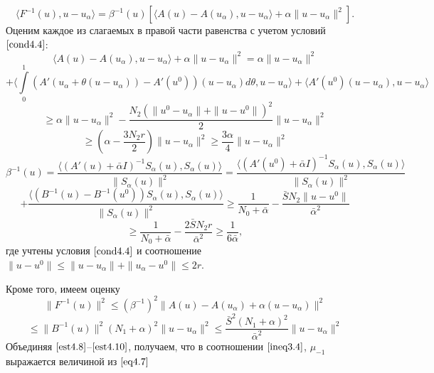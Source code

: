 $$\langle F^{-1}(u), u-u_\alpha\rangle=\beta ^{-1}(u)[\langle A(u)-A(u_\alpha), u-u_\alpha\rangle+\alpha\|u-u_\alpha\|^2].$$
Оценим каждое из слагаемых в правой части равенства с учетом условий $\eqref{cond4.4}$:
$$\langle A(u)-A(u_\alpha), u-u_\alpha\rangle+\alpha\|u-u_\alpha\|^2=\alpha\|u-u_\alpha\|^2$$ $$+\langle \int\limits_0^1 (A'(u_\alpha+\theta(u-u_\alpha))-A'(u^0))(u-u_\alpha)d\theta, u-u_\alpha\rangle+\langle A'(u^0)(u-u_\alpha), u-u_\alpha\rangle$$ $$\ge \alpha\|u-u_\alpha\|^2-\frac{N_2(\|u^0-u_\alpha\|+\|u-u^0\|)^2}{2}\|u-u_\alpha\|^2$$
\begin{equation}\label {est4.8}
\ge\left ( \alpha-\frac{3N_2 r}{2}\right )\|u-u_\alpha\|^2\ge\frac{3\alpha}{4}\|u-u_\alpha\|^2
\end{equation}
$$\beta ^{-1}(u)=\frac{\langle (A'(u)+\bar\alpha I)^{-1}S_\alpha(u), S_\alpha(u)\rangle}{\|S_\alpha(u)\|^2}=\frac{\langle (A'(u^0)+\bar\alpha I)^{-1}S_\alpha(u), S_\alpha(u)\rangle}{\|S_\alpha(u)\|^2}$$ $$+\frac{\langle (B^{-1}(u)-B^{-1}(u^0))S_\alpha(u), S_\alpha(u)\rangle}{\|S_\alpha(u)\|^2}\ge\frac{1}{N_0+\bar\alpha}-\frac{\bar S N_2\|u-u^0\|}{\bar\alpha^2}$$
\begin{equation}\label{est4.9}
\ge\frac{1}{N_0+\bar\alpha}-\frac{2\bar S N_2 r}{\bar\alpha^2}\ge\frac{1}{6\bar\alpha},
\end{equation}
где учтены условия $\eqref{cond4.4}$ и соотношение $\|u-u^0\|\le\|u-u_\alpha\|+\|u_\alpha-u^0\|\le 2r$.

Кроме того, имеем оценку
$$\|F^{-1}(u)\|^2\le(\beta^{-1})^2\|A(u)-A(u_\alpha)+\alpha(u-u_\alpha)\|^2$$
\begin{equation}\label{est4.10}
\le\|B^{-1}(u)\|^2(N_1+\alpha)^2\|u-u_\alpha\|^2\le\frac{\bar S^2(N_1+\alpha)^2}{\bar\alpha^2}\|u-u_\alpha\|^2
\end{equation}
Объединяя $\eqref{est4.8}$--$\eqref{est4.10}$, получаем, что в соотношении $\eqref{ineq3.4}$, $\mu_{-1}$ выражается величиной из $\eqref{eq4.7}$


